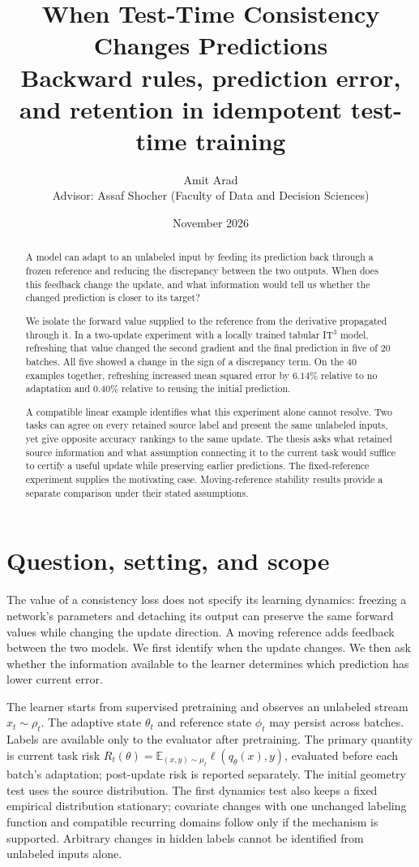 \documentclass[11pt,a4paper]{article}
\title{When Test-Time Consistency Changes Predictions\\[0.4em]
\large Backward rules, prediction error, and retention in idempotent test-time training}
\author{Amit Arad\\[0.3em]
\small Advisor: Assaf Shocher (Faculty of Data and Decision Sciences)}
\date{November 2026}
\newcommand{\E}{\mathbb{E}}
\begin{document}
\maketitle
\begin{abstract}
A model can adapt to an unlabeled input by feeding its prediction back
through a frozen reference and reducing the discrepancy between the two
outputs. When does this feedback change the update, and what information
would tell us whether the changed prediction is closer to its target?

We isolate the forward value supplied to the reference from the derivative
propagated through it. In a two-update experiment with a locally trained
tabular IT$^3$ model, refreshing that value changed the second gradient and
the final prediction in five of 20 batches. All five showed a change in
the sign of a discrepancy term. On the 40 examples together, refreshing
increased mean squared error by $6.14\%$ relative to no adaptation and
$0.40\%$ relative to reusing the initial prediction.

A compatible linear example identifies what this experiment alone cannot
resolve. Two tasks can agree on every retained source label and present
the same unlabeled inputs, yet give opposite accuracy rankings to the
same update. The thesis asks what retained source information and what
assumption connecting it to the current task would suffice to certify
a useful update while preserving earlier predictions. The fixed-reference
experiment supplies the motivating case. Moving-reference stability
results provide a separate comparison under their stated assumptions.
\end{abstract}

\section{Question, setting, and scope}
The value of a consistency loss does not specify its learning dynamics:
freezing a network's parameters and detaching its output can preserve the
same forward values while changing the update direction. A moving reference
adds feedback between the two models. We first identify when the update
changes. We then ask whether the information available to the learner
determines which prediction has lower current error.

The learner starts from supervised pretraining and observes an unlabeled
stream $x_t\sim\rho_t$. The adaptive state $\theta_t$ and reference state
$\phi_t$ may persist across batches. Labels are available only to the
evaluator after pretraining. The primary quantity is current task risk
$R_t(\theta)=\E_{(x,y)\sim\mu_t}\ell(q_\theta(x),y)$, evaluated before each
batch's adaptation; post-update risk is reported separately. The initial geometry test uses the source distribution. The first dynamics
test also keeps a fixed empirical distribution stationary; covariate changes with one
unchanged labeling function and compatible recurring domains follow only
if the mechanism is supported. Arbitrary changes in hidden
labels cannot be identified from unlabeled inputs alone.
\end{document}

